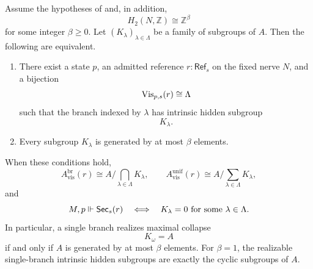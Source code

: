 \begin{corollary}\label{cor:torsion-free-h2-classification}
Assume the hypotheses of  and, in addition,
\[
H_2(N,\mathbb Z)\cong \mathbb Z^\beta
\]
for some integer $\beta\ge 0$. Let $(K_\lambda)_{\lambda\in\Lambda}$ be a family of subgroups of $A$. Then the following are equivalent.
\begin{enumerate}[label=(\roman*),nosep]
\item There exist a state $p$, an admitted reference $r:\mathsf{Ref}_s$ on the fixed nerve $N$, and a bijection
\[
\mathrm{Vis}_{p,s}(r)\cong \Lambda
\]
such that the branch indexed by $\lambda$ has intrinsic hidden subgroup
\[
K_\lambda.
\]
\item Every subgroup $K_\lambda$ is generated by at most $\beta$ elements.
\end{enumerate}
When these conditions hold,
\[
A_{\mathrm{vis}}^{\mathrm{br}}(r)\cong A\Big/\bigcap_{\lambda\in\Lambda}K_\lambda,
\qquad
A_{\mathrm{vis}}^{\mathrm{unif}}(r)\cong A\Big/\sum_{\lambda\in\Lambda}K_\lambda,
\]
and
\[
M,p\Vdash \mathsf{Sec}_s(r)
\quad\Longleftrightarrow\quad
K_\lambda=0\ \text{for some}\ \lambda\in\Lambda.
\]
In particular, a single branch realizes maximal collapse
\[
K_\omega=A
\]
if and only if $A$ is generated by at most $\beta$ elements. For $\beta=1$, the realizable single-branch intrinsic hidden subgroups are exactly the cyclic subgroups of $A$.
\end{corollary}

